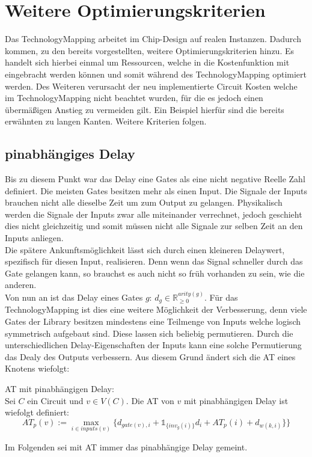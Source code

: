 \documentclass[11pt, a4paper, german]{article}
\newcommand{\TM}{TechnologyMapping }
\begin{document}
\section{Weitere Optimierungskriterien}
Das \TM arbeitet im Chip-Design auf realen Instanzen. Dadurch kommen, zu den bereits vorgestellten, weitere Optimierungskriterien hinzu. Es handelt sich hierbei einmal um Ressourcen, welche in die Kostenfunktion mit eingebracht werden können und somit während des \TM optimiert werden. Des Weiteren verursacht der neu implementierte Circuit Kosten welche im \TM nicht beachtet wurden, für die es jedoch einen übermäßigen Anstieg zu vermeiden gilt. Ein Beispiel hierfür sind die bereits erwähnten zu langen Kanten. Weitere Kriterien folgen. 
\subsection{pinabhängiges Delay}
\label{subsec:pinabh_delay}
Bis zu diesem Punkt war das Delay eine Gates als eine nicht negative Reelle Zahl definiert. Die meisten Gates besitzen mehr als einen Input. Die Signale der Inputs brauchen nicht alle dieselbe Zeit um zum Output zu gelangen. Physikalisch werden die Signale der Inputs zwar alle miteinander verrechnet, jedoch geschieht dies nicht gleichzeitig und somit müssen nicht alle Signale zur selben Zeit an den Inputs anliegen.\\
Die spätere Ankunftsmöglichkeit lässt sich durch einen kleineren Delaywert, spezifisch für diesen Input, realisieren. Denn wenn das Signal schneller durch das Gate gelangen kann, so brauchst es auch nicht so früh vorhanden zu sein, wie die anderen. \\
Von nun an ist das Delay eines Gates $g$: $d_g \in \mathbb{R}_{\geq 0}^{arity(g)}$. Für das \TM ist dies eine weitere Möglichkeit der Verbesserung, denn viele Gates der Library besitzen mindestens eine Teilmenge von Inputs welche logisch symmetrisch aufgebaut sind. Diese lassen sich beliebig permutieren. Durch die unterschiedlichen Delay-Eigenschaften der Inputs kann eine solche Permutierung das Dealy des Outputs verbessern. Aus diesem Grund ändert sich die AT eines Knotens wiefolgt: 
\begin{definition}{AT mit pinabhängigen Delay:}\\
	Sei $C$ ein Circuit und $v \in V(C)$. Die AT von $v$ mit pinabhängigen Delay ist wiefolgt definiert: \[ AT_p(v) :=  \max\limits_{i \in inputs(v)} \{   d_{gate(v),i} + \mathbb{1}_{\{inv_g(i) \}} d_{i} + AT_p(i) + d_{w(k,i)} \}   \}\]
\end{definition}
Im Folgenden sei mit AT immer das pinabhängige Delay gemeint.
\end{document}
